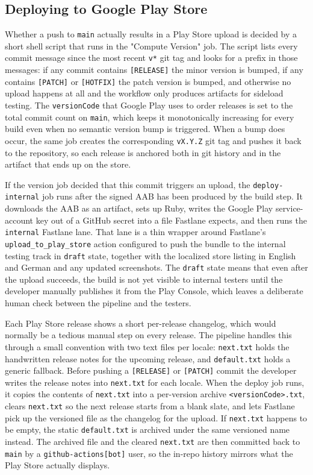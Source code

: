 \subsection{Deploying to Google Play Store}

Whether a push to \texttt{main} actually results in a Play Store upload is decided by a short shell script that runs in the "Compute Version" job. The script lists every commit message since the most recent \texttt{v*} git tag and looks for a prefix in those messages: if any commit contains \texttt{[RELEASE]} the minor version is bumped, if any contains \texttt{[PATCH]} or \texttt{[HOTFIX]} the patch version is bumped, and otherwise no upload happens at all and the workflow only produces artifacts for sideload testing. The \texttt{versionCode} that Google Play uses to order releases is set to the total commit count on \texttt{main}, which keeps it monotonically increasing for every build even when no semantic version bump is triggered. When a bump does occur, the same job creates the corresponding \texttt{vX.Y.Z} git tag and pushes it back to the repository, so each release is anchored both in git history and in the artifact that ends up on the store.

If the version job decided that this commit triggers an upload, the \texttt{deploy-internal} job runs after the signed AAB has been produced by the build step. It downloads the AAB as an artifact, sets up Ruby, writes the Google Play service-account key out of a GitHub secret into a file Fastlane expects, and then runs the \texttt{internal} Fastlane lane. That lane is a thin wrapper around Fastlane's \texttt{upload\_to\_play\_store} action configured to push the bundle to the internal testing track in \texttt{draft} state, together with the localized store listing in English and German and any updated screenshots. The \texttt{draft} state means that even after the upload succeeds, the build is not yet visible to internal testers until the developer manually publishes it from the Play Console, which leaves a deliberate human check between the pipeline and the testers.

Each Play Store release shows a short per-release changelog, which would normally be a tedious manual step on every release. The pipeline handles this through a small convention with two text files per locale: \texttt{next.txt} holds the handwritten release notes for the upcoming release, and \texttt{default.txt} holds a generic fallback. Before pushing a \texttt{[RELEASE]} or \texttt{[PATCH]} commit the developer writes the release notes into \texttt{next.txt} for each locale. When the deploy job runs, it copies the contents of \texttt{next.txt} into a per-version archive \texttt{<versionCode>.txt}, clears \texttt{next.txt} so the next release starts from a blank slate, and lets Fastlane pick up the versioned file as the changelog for the upload. If \texttt{next.txt} happens to be empty, the static \texttt{default.txt} is archived under the same versioned name instead. The archived file and the cleared \texttt{next.txt} are then committed back to \texttt{main} by a \texttt{github-actions[bot]} user, so the in-repo history mirrors what the Play Store actually displays.

